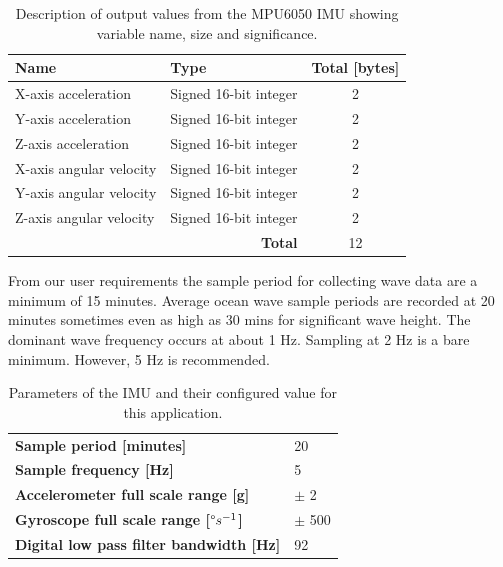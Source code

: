\begin{table}[H]
	\centering
	\caption{Description of output values from the MPU6050 IMU showing variable name, size and significance.}
	\setlength{\extrarowheight}{5pt}
	\small
	\begin{tabular}{llc}
		\hline
		\textbf{Name} & \textbf{Type} &\textbf{Total [bytes]} \\
		\hline
		\hline
		X-axis acceleration & Signed 16-bit integer & 2\\

		Y-axis acceleration & Signed 16-bit integer & 2\\

		Z-axis acceleration & Signed 16-bit integer & 2\\

		X-axis angular velocity & Signed 16-bit integer & 2\\

		Y-axis angular velocity & Signed 16-bit integer & 2\\
		Z-axis angular velocity & Signed 16-bit integer & 2\\
		\hline
		\hline
		\multicolumn{2}{r}{\textbf{Total}} &\multicolumn{1}{c}{12}\\
		\cline{3-3}
		\cline{3-3}
	\end{tabular}
	
	\label{tab:IMU_data_outl}
\end{table}

From our user requirements the sample period for collecting wave data are a minimum of 15 minutes. Average ocean wave sample periods are recorded at 20 minutes sometimes even as high as 30 mins for significant wave height. The dominant wave frequency occurs at about 1 Hz. Sampling at 2 Hz \cite{kohout2015device} is a bare minimum. However, 5 Hz is recommended. 

\begin{table}[H]
	\centering
	\caption{Parameters of the IMU and their configured value for this application.}
	\setlength{\extrarowheight}{5pt}
	\small
	\label{tab:IMU_param}
	\begin{tabular}{ll}
		\hline
		\hline
		\textbf{Sample period [minutes]}  & 20 \\

		\textbf{Sample frequency [Hz]} & 5 \\

		\textbf{Accelerometer full scale range [g]} & $\pm$ 2\\ 

		\textbf{Gyroscope full scale range [$\degree s^{-1}$]} & $\pm$ 500\\

		\textbf{Digital low pass filter bandwidth [Hz]} & 92\\ 
		\hline
		\hline
	\end{tabular}

\end{table}

